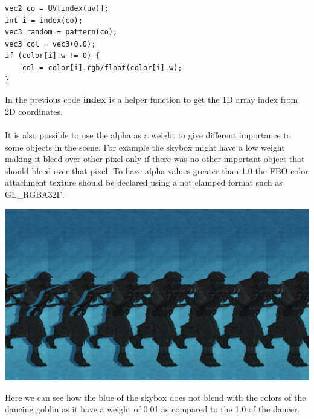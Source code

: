\documentclass[12pt, a4paper]{article}
\begin{document}
\begin{lstlisting}[caption={Second pass color blending},captionpos=b]
vec2 co = UV[index(uv)];
int i = index(co);
vec3 random = pattern(co);
vec3 col = vec3(0.0);
if (color[i].w != 0) {
    col = color[i].rgb/float(color[i].w);
}
\end{lstlisting}
In the previous code \textbf{index} is a helper function to get the 1D array index from 2D coordinates.\\\\
It is also possible to use the alpha as a weight to give different importance to some objects in the scene. For example the skybox might have a low weight
making it bleed over other pixel only if there was no other important object that should bleed over that pixel.
To have alpha values greater than 1.0 the FBO color attachment texture should be declared using a not clamped format such as GL\_RGBA32F.
\begin{center}
    \centering
    \includegraphics[width=1.0\textwidth]{img/dance.png}
\end{center}
Here we can see how the blue of the skybox does not blend with the colors of the dancing goblin as it have a weight of 0.01 as compared to the
1.0 of the dancer.
\end{document}
